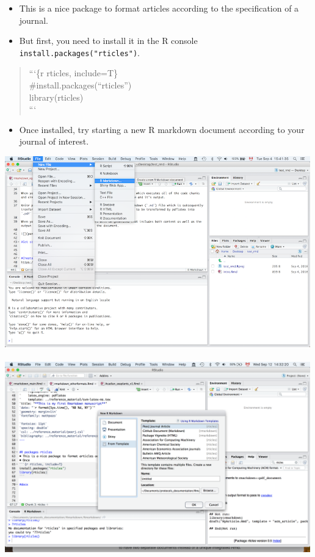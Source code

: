 \documentclass[]{article}
\providecommand{\tightlist}{%
  \setlength{\itemsep}{0pt}\setlength{\parskip}{0pt}}
\begin{document}
\begin{itemize}
\item
  This is a nice package to format articles according to the
  specification of a journal.
\item
  But first, you need to install it in the R console
  \texttt{install.packages("rticles")}.
\end{itemize}

\begin{quote}
```\{r rticles, include=T\}\\
\#install.packages(``rticles'')\\
library(rticles)\\
```
\end{quote}

\begin{itemize}
\tightlist
\item
  Once installed, try starting a new R markdown document according to
  your journal of interest.
\end{itemize}

\includegraphics[width=5.20833in,height=\textheight]{../figures/getstarted.png}\\
\hspace*{0.333em}\\
\includegraphics[width=5.20833in,height=\textheight]{../figures/from_template.png}\\
\hspace*{0.333em}
\end{document}
